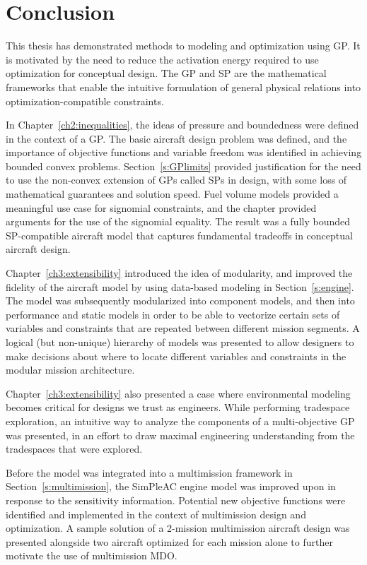 \chapter{Conclusion}
\label{ch5:conclusion}

This thesis has demonstrated methods to modeling and optimization using \gls{GP}. It
is motivated by the need to reduce the activation energy required to use
optimization for conceptual design. The \gls{GP} and \gls{SP} are the
mathematical frameworks that enable the intuitive formulation of general
physical relations into optimization-compatible constraints.

In Chapter~\ref{ch2:inequalities}, the ideas of pressure and boundedness were
defined in the context of a \gls{GP}. The basic aircraft design problem was defined,
and the importance of objective functions and variable freedom
was identified in achieving bounded convex problems.
Section~\ref{s:GPlimits} provided justification for the need to use the non-convex
extension of \gls{GP}s called \gls{SP}s in design, with some loss of mathematical
guarantees and solution speed. Fuel volume models provided a meaningful use
case for signomial constraints, and the chapter provided arguments for the use of the signomial
equality. The result was a fully bounded \gls{SP}-compatible aircraft model that captures
fundamental tradeoffs in conceptual aircraft design.

Chapter~\ref{ch3:extensibility} introduced the idea of modularity, and improved
the fidelity of the aircraft model by using data-based modeling in Section~\ref{s:engine}.
The model was subsequently modularized
into component models, and then into performance and static models in order to
be able to vectorize certain sets of variables and constraints that are repeated between
different mission segments. A logical (but non-unique) hierarchy of models
was presented to allow designers to make decisions about where to locate different variables
and constraints in the modular mission architecture.

Chapter~\ref{ch3:extensibility} also presented a case where environmental modeling becomes critical
for designs we trust as engineers. While performing tradespace exploration, an intuitive
way to analyze the components of a multi-objective \gls{GP} was presented, in
an effort to draw maximal engineering understanding from the tradespaces that were explored.

Before the model was integrated into a multimission framework in Section~\ref{s:multimission},
the SimPleAC engine model was improved upon
in response to the sensitivity information. Potential
new objective functions were identified and implemented in the context of multimission design
and optimization.
A sample solution of a 2-mission multimission aircraft design
was presented alongside two aircraft optimized for each mission alone to further motivate
the use of multimission \gls{MDO}.

